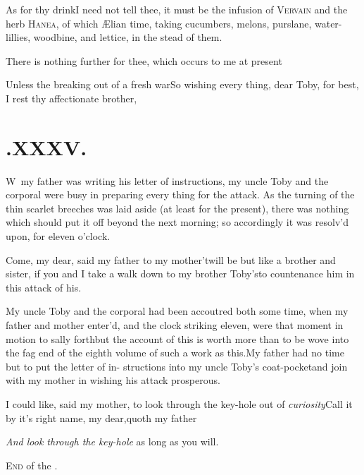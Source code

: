 \documentclass{article}
\begin{document}
As for thy drink\tsk I need not tell thee, it must be the
infusion of \textsc{Vervain} and the herb
\textsc{Hanea}, of which Ælian
time, taking cucumbers, melons, purs\-lane, water-lillies, woodbine, and lettice,
in the stead of them.

There is nothing further for thee, which occurs to me at
present\tsh

\tsh Unless the breaking out of a fresh
war\tsh So wishing every thing, dear Toby, for
best,\\[3pt]
\indent I rest thy affectionate brother,\\[3pt]

\section{.\enspace XXXV.}

\lettrine{W}{\,} my father was writing his
letter of instructions, my uncle Toby and the corporal were
busy in preparing every thing for the attack. As the turning of the
thin scarlet breeches was laid aside (at least for the present),
there was nothing which should put it off beyond the next morning;
so accordingly it was resolv’d upon, for eleven
o’clock.

Come, my dear, said my father to my mother\tsk ’twill be
but like a brother and sister, if you and I take a walk down to my
brother Toby’s\tsh to countenance him in this
attack of his.

\vskip -6pt

My uncle Toby and the corporal had been accoutred both some time, when my father and
mother enter’d, and the clock striking eleven, were that moment in motion to sally
forth\tsk but the account of this is worth more than to be wove into the fag end of
the eighth volume of such a work as this.\tsh My father had no time but to put the
letter of in- structions into my uncle Toby’s coat-pocket\tsh and join with my mother
in wishing his attack prosperous.


I could like, said my mother, to look through the key-hole out
of \textit{curiosity}\tsh\break Call it by it’s right name, my
dear,\break quoth my father\tsk 

\textit{And look through the key-hole} as long as you will.

\vfill
\centerline{\textsc{End} of the .}
\vfill
\end{document}

